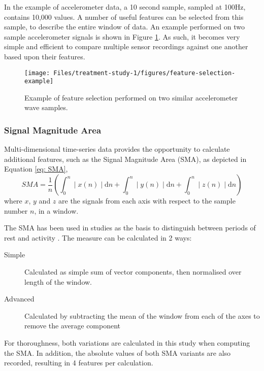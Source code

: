In the example of accelerometer data, a 10 second sample, sampled at 100Hz, contains 10,000 values. A number of useful features can be selected from this sample, to describe the entire window of data. An example performed on two sample accelerometer signals is shown in Figure \ref{fig: feature-selection-example}. As such, it becomes very simple and efficient to compare multiple sensor recordings against one another based upon their features.

\begin{figure}[h]
    \centering
        \texttt{[image: Files/treatment-study-1/figures/feature-selection-example]}
        \caption{Example of feature selection performed on two similar accelerometer wave samples.}
        \label{fig: feature-selection-example}
\end{figure}

\subsubsection{Signal Magnitude Area}
Multi-dimensional time-series data provides the opportunity to calculate additional features, such as the Signal Magnitude Area (SMA), as depicted in Equation \ref{eq: SMA},
\begin{equation}
SMA =\frac{1}{n} \left(\int_{0}^{n} \mid x(n)\mid \text{d} n + \int_{0}^{n} \mid y(n)\mid \text{d} n + \int_{0}^{n} \mid z(n)\mid \text{d} n  \right)
\label{eq: SMA}
\end{equation}
where $x$, $y$ and $z$ are the signals from each axis with respect to the sample number $n$, in a window.

The SMA has been used in studies as the basis to distinguish between periods of rest and activity \cite{Mathie2004, Karantonis2006}. The measure can be calculated in 2 ways:
\begin{description}
	\item [Simple] Calculated as simple sum of vector components, then normalised over length of the window.
	\item [Advanced] Calculated by subtracting the mean of the window from each of the axes to remove the average component
\end{description}

For thoroughness, both variations are calculated in this study when computing the SMA. In addition, the absolute values of both SMA variants are also recorded, resulting in 4 features per calculation.


